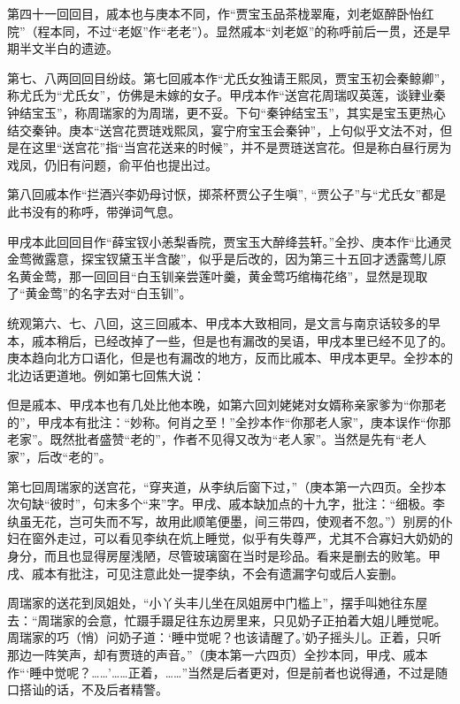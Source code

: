 \par 第四十一回回目，戚本也与庚本不同，作“贾宝玉品茶栊翠庵，刘老妪醉卧怡红院”（程本同，不过“老妪”作“老老”）。显然戚本“刘老妪”的称呼前后一贯，还是早期半文半白的遗迹。
\par 第七、八两回回目纷歧。第七回戚本作“尤氏女独请王熙凤，贾宝玉初会秦鲸卿”，称尤氏为“尤氏女”，仿佛是未嫁的女子。甲戌本作“送宫花周瑞叹英莲，谈肄业秦钟结宝玉”，称周瑞家的为周瑞，更不妥。下句“秦钟结宝玉”，其实是宝玉更热心结交秦钟。庚本“送宫花贾琏戏熙凤，宴宁府宝玉会秦钟”，上句似乎文法不对，但是在这里“送宫花”指“当宫花送来的时候”，并不是贾琏送宫花。但是称白昼行房为戏凤，仍旧有问题，俞平伯也提出过。
\par 第八回戚本作“拦酒兴李奶母讨恹，掷茶杯贾公子生嗔”, “贾公子”与“尤氏女”都是此书没有的称呼，带弹词气息。
\par 甲戌本此回回目作“薛宝钗小恙梨香院，贾宝玉大醉绛芸轩。”全抄、庚本作“比通灵金莺微露意，探宝钗黛玉半含酸”，似乎是后改的，因为第三十五回才透露莺儿原名黄金莺，那一回回目“白玉钏亲尝莲叶羹，黄金莺巧绾梅花络”，显然是现取了“黄金莺”的名字去对“白玉钏”。
\par 统观第六、七、八回，这三回戚本、甲戌本大致相同，是文言与南京话较多的早本，戚本稍后，已经改掉了一些，但是也有漏改的吴语，甲戌本里已经不见了的。庚本趋向北方口语化，但是也有漏改的地方，反而比戚本、甲戌本更早。全抄本的北边话更道地。例如第七回焦大说：
\par 但是戚本、甲戌本也有几处比他本晚，如第六回刘姥姥对女婿称亲家爹为“你那老的”，甲戌本有批注：“妙称。何肖之至！”全抄本作“你那老人家”，庚本误作“你那老家”。既然批者盛赞“老的”，作者不见得又改为“老人家”。当然是先有“老人家”，后改“老的”。
\par 第七回周瑞家的送宫花，“穿夹道，从李纨后窗下过，”（庚本第一六四页。全抄本次句缺“彼时”，句末多个“来”字。甲戌、戚本缺加点的十九字，批注：“细极。李纨虽无花，岂可失而不写，故用此顺笔便墨，间三带四，使观者不忽。”）别房的仆妇在窗外走过，可以看见李纨在炕上睡觉，似乎有失尊严，尤其不合寡妇大奶奶的身分，而且也显得房屋浅陋，尽管玻璃窗在当时是珍品。看来是删去的败笔。甲戌、戚本有批注，可见注意此处一提李纨，不会有遗漏字句或后人妄删。
\par 周瑞家的送花到凤姐处，“小丫头丰儿坐在凤姐房中门槛上”，摆手叫她往东屋去：“周瑞家的会意，忙蹑手蹑足往东边房里来，只见奶子正拍着大姐儿睡觉呢。周瑞家的巧（悄）问奶子道：‘睡中觉呢？也该请醒了。’奶子摇头儿。正着，只听那边一阵笑声，却有贾琏的声音。”（庚本第一六四页）全抄本同，甲戌、戚本作“‘睡中觉呢？……'……正着，……”当然是后者更对，但是前者也说得通，不过是随口搭讪的话，不及后者精警。
